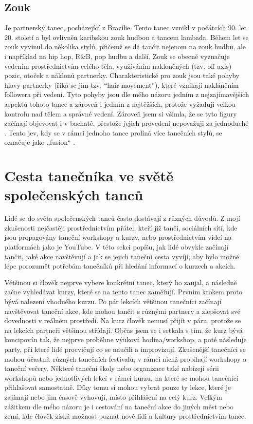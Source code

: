 \subsection{Zouk}
Je partnerský tanec, pocházející z Brazílie. Tento tanec vznikl v počátcích 90. let 20. století a byl ovlivněn karibskou zouk hudbou a tancem lambada. Během let se zouk vyvinul do několika stylů, přičemž se dá tančit nejenom na zouk hudbu, ale i například na hip hop, R\&B, pop hudbu a další. Zouk se obecně vyznačuje vedením prostřednictvím celého těla, využíváním nakloněných (tzv. off-axis) pozic, otoček a náklonů partnerky. Charakteristické pro zouk jsou také pohyby hlavy partnerky (říká se jim tzv. “hair movement”), které vznikají nakláněním followera při vedení. Tyto pohyby jsou dle mého názoru jedním z nejzajímavějších aspektů tohoto tance a zároveň i jedním z nejtěžších, protože vyžadují velkou kontrolu nad tělem a správné vedení. Zároveň jsem si všimla, že se tyto figury začínají objevovat i v bachatě, přestože jejich provedení nepovažuji za jednoduché \cite{zoukminneapolis_brazilian_zouk}. Tento jev, kdy se v rámci jednoho tance prolíná více tanečních stylů, se označuje jako „fusion“ \cite{centrumtance_dance_fusion}.

\section{Cesta tanečníka ve světě společenských tanců}
Lidé se do světa společenských tanců často dostávají z různých důvodů. Z mojí zkušenosti nejčastěji prostřednictvím přátel, kteří již tančí, sociálních sítí, kde jsou propagovány taneční workshopy a kurzy, nebo prostřednictvím videí na platformách jako je YouTube. V této sekci popíšu, jak lidé obvykle začínají tančit, jaké akce navštěvují a jak se jejich taneční cesta vyvíjí, aby bylo možné lépe porozumět potřebám tanečníků při hledání informací o kurzech a akcích.

Většinou si člověk nejprve vybere konkrétní tanec, který ho zaujal, a následně začne vyhledávat kurzy, které se na tento tanec zaměřují. Prvním krokem proto bývá nalezení vhodného kurzu.
Po pár lekcích většinou tanečníci začínají navštěvovat taneční akce, kde mohou tančit s různými partnery a zlepšovat své dovednosti v reálném prostředí. Na kurz člověk nemusí přijít v páru, protože se na lekcích partneři většinou střídají. Občas jsem se i setkala s tím, že kurz bývá koncipován tak, že nejprve proběhne výuková hodina/workshop, a poté následuje 
party, při které lidé procvičují co se naučili a improvizují. Zkušenější tanečníci se mohou účastnit různých tanečních festivalů, v rámci nichž probíhají workshopy a taneční večery. Některé taneční školy nebo organizace také nabízejí sérii workshopů nebo jednotlivých lekcí v rámci kurzu, na které se mohou tanečníci přihlašovat samostatně. Díky tomu si mohou vybrat pouze ty lekce, které je zajímají nebo jim časově vyhovují, místo přihlášení na celý kurz.
Velkým zážitkem dle mého názoru je i cestování na taneční akce do jiných měst nebo zemí, kde člověk získá možnost poznat nové lidi a kultury prostřednictvím tance. \cite{socialDance:about}

